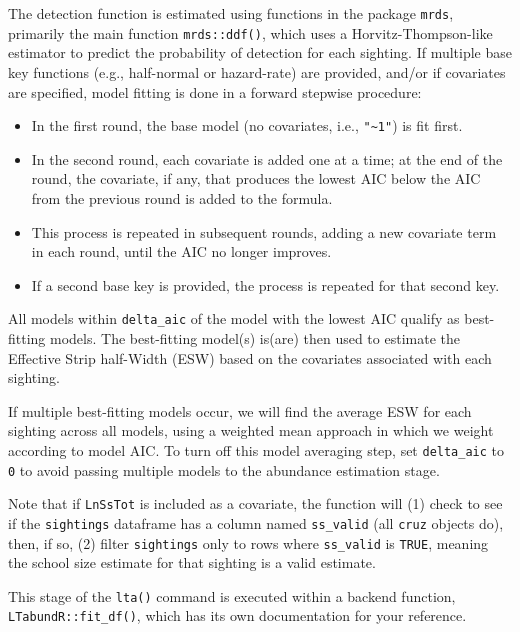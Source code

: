 \documentclass[
]{book}
\providecommand{\tightlist}{%
  \setlength{\itemsep}{0pt}\setlength{\parskip}{0pt}}
\begin{document}
The detection function is estimated using functions in the package \texttt{mrds}, primarily the main function \texttt{mrds::ddf()}, which uses a Horvitz-Thompson-like estimator to predict the probability of detection for each sighting. If multiple base key functions (e.g., half-normal or hazard-rate) are provided, and/or if covariates are specified, model fitting is done in a forward stepwise procedure:

\begin{itemize}
\tightlist
\item
  In the first round, the base model (no covariates, i.e., \texttt{"\textasciitilde{}1"}) is fit first.\\
\item
  In the second round, each covariate is added one at a time; at the end of the round, the covariate, if any, that produces the lowest AIC below the AIC from the previous round is added to the formula.\\
\item
  This process is repeated in subsequent rounds, adding a new covariate term in each round, until the AIC no longer improves.
\item
  If a second base key is provided, the process is repeated for that second key.
\end{itemize}

All models within \texttt{delta\_aic} of the model with the lowest AIC qualify as best-fitting models. The best-fitting model(s) is(are) then used to estimate the Effective Strip half-Width (ESW) based on the covariates associated with each sighting.

If multiple best-fitting models occur, we will find the average ESW for each sighting across all models, using a weighted mean approach in which we weight according to model AIC. To turn off this model averaging step, set \texttt{delta\_aic} to \texttt{0} to avoid passing multiple models to the abundance estimation stage.

Note that if \texttt{LnSsTot} is included as a covariate, the function will (1) check to see if the \texttt{sightings} dataframe has a column named \texttt{ss\_valid} (all \texttt{cruz} objects do), then, if so, (2) filter \texttt{sightings} only to rows where \texttt{ss\_valid} is \texttt{TRUE}, meaning the school size estimate for that sighting is a valid estimate.

This stage of the \texttt{lta()} command is executed within a backend function, \texttt{LTabundR::fit\_df()}, which has its own documentation for your reference.
\end{document}
